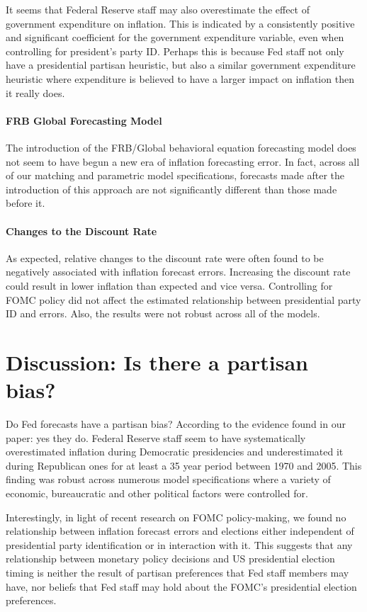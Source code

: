 \documentclass[a4paper]{article}\usepackage{graphicx, color}
\begin{document}
It seems that Federal Reserve staff may also overestimate the effect of government expenditure on inflation. This is indicated by a consistently positive and significant coefficient for the government expenditure variable, even when controlling for president's party ID. Perhaps this is because Fed staff not only have a presidential partisan heuristic, but also a similar government expenditure heuristic where expenditure is believed to have a larger impact on inflation then it really does.

\paragraph{FRB Global Forecasting Model}

The introduction of the FRB/Global behavioral equation forecasting model does not seem to have begun a new era of inflation forecasting error. In fact, across all of our matching and parametric model specifications, forecasts made after the introduction of this approach are not significantly different than those made before it. 

\paragraph{Changes to the Discount Rate}

As expected, relative changes to the discount rate were often found to be negatively associated with inflation forecast errors. Increasing the discount rate could result in lower inflation than expected and vice versa. Controlling for FOMC policy did not affect the estimated relationship between presidential party ID and errors. Also, the results were not robust across all of the models. 

\section*{Discussion: Is there a partisan bias?}

Do Fed forecasts have a partisan bias? According to the evidence found in our paper: yes they do. Federal Reserve staff seem to have systematically overestimated inflation during Democratic presidencies and underestimated it during Republican ones for at least a 35 year period between 1970 and 2005. This finding was robust across numerous model specifications where a variety of economic, bureaucratic and other political factors were controlled for. 

Interestingly, in light of recent research on FOMC policy-making, we found no relationship between inflation forecast errors and elections either independent of presidential party identification or in interaction with it. This suggests that any relationship between monetary policy decisions and US presidential election timing is neither the result of partisan preferences that Fed staff members may have, nor beliefs that Fed staff may hold about the FOMC's presidential election preferences. 
\end{document}
